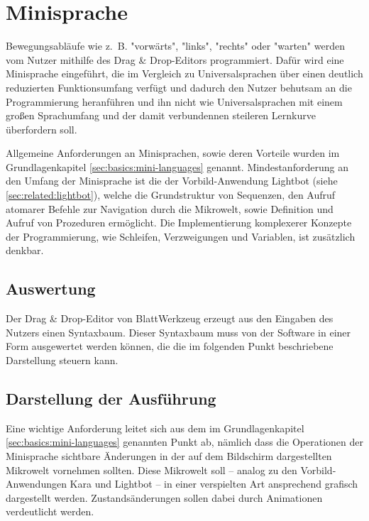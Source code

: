 \section{Minisprache}
\label{sec:requirements:program}

Bewegungsabläufe wie z.~B. "vorwärts", "links", "rechts" oder "warten" werden vom Nutzer mithilfe des Drag \& Drop-Editors programmiert. Dafür wird eine Minisprache eingeführt, die im Vergleich zu Universalsprachen über einen deutlich reduzierten Funktionsumfang verfügt und dadurch den Nutzer behutsam an die Programmierung heranführen und ihn nicht wie Universalsprachen mit einem großen Sprachumfang und der damit verbundennen steileren Lernkurve überfordern soll.

Allgemeine Anforderungen an Minisprachen, sowie deren Vorteile wurden im Grundlagenkapitel \ref{sec:basics:mini-languages} genannt. Mindestanforderung an den Umfang der Minisprache ist die der Vorbild-Anwendung Lightbot (siehe \ref{sec:related:lightbot}), welche die Grundstruktur von Sequenzen, den Aufruf atomarer Befehle zur Navigation durch die Mikrowelt, sowie Definition und Aufruf von Prozeduren ermöglicht. Die Implementierung komplexerer Konzepte der Programmierung, wie Schleifen, Verzweigungen und Variablen, ist zusätzlich denkbar.

\subsection{Auswertung}
\label{sec:requirements:world:compile-interpret}

Der Drag \& Drop-Editor von BlattWerkzeug  erzeugt aus den Eingaben des Nutzers einen Syntaxbaum. Dieser Syntaxbaum muss von der Software in einer Form ausgewertet werden können, die die im folgenden Punkt beschriebene Darstellung steuern kann.

\subsection{Darstellung der Ausführung}
\label{sec:requirements:world:display}

Eine wichtige Anforderung leitet sich aus dem im Grundlagenkapitel \ref{sec:basics:mini-languages} genannten Punkt ab, nämlich dass die Operationen der Minisprache sichtbare Änderungen in der auf dem Bildschirm dargestellten Mikrowelt vornehmen sollten. Diese Mikrowelt soll -- analog zu den Vorbild-Anwendungen Kara und Lightbot -- in einer verspielten Art ansprechend grafisch dargestellt werden. Zustandsänderungen sollen dabei durch Animationen verdeutlicht werden.

